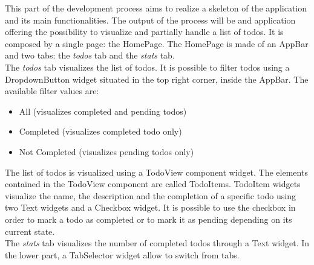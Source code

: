 
This part of the development process aims to realize a skeleton of the application and its main functionalities. The output of the process will be and application offering the possibility to visualize and partially handle a list of todos. It is composed by a single page: the HomePage. The HomePage is made of an AppBar and two tabs: the \textit{todos} tab and the \textit{stats} tab. \\
The \textit{todos} tab visualizes the list of todos. It is possible to filter todos using a DropdownButton widget situated in the top right corner, inside the AppBar. 
The available filter values are:
\begin{itemize}
    \item All (visualizes completed and pending todos)
    \item Completed (visualizes completed todo only)
    \item Not Completed (visualizes pending todos only)
\end{itemize}
The list of todos is visualized using a TodoView component widget. The elements contained in the TodoView component are called TodoItems. TodoItem widgets visualize the name, the description and the completion of a specific todo using two Text widgets and a Checkbox widget. It is possible to use the checkbox in order to mark a todo as completed or to mark it as pending depending on its current state. \\
The \textit{stats} tab visualizes the number of completed todos through a Text widget.
In the lower part, a TabSelector widget allow to switch from tabs.

